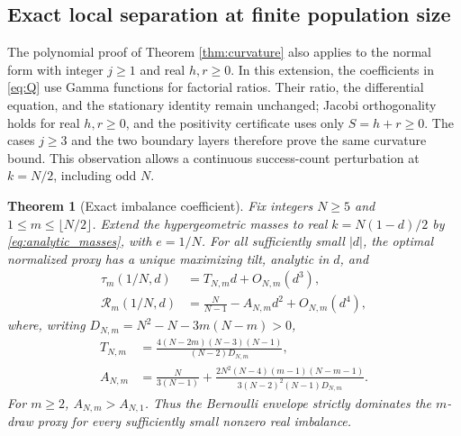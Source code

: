 \documentclass[11pt,a4paper]{article}
\newtheorem{theorem}{Theorem}[section]
\begin{document}
\subsection{Exact local separation at finite population size}
The polynomial proof of Theorem \ref{thm:curvature} also applies to the normal form with integer $j\ge1$ and real $h,r\ge0$. In this extension, the coefficients in \eqref{eq:Q} use Gamma functions for factorial ratios. Their ratio, the differential equation, and the stationary identity remain unchanged; Jacobi orthogonality holds for real $h,r\ge0$, and the positivity certificate uses only $S=h+r\ge0$. The cases $j\ge3$ and the two boundary layers therefore prove the same curvature bound. This observation allows a continuous success-count perturbation at $k=N/2$, including odd $N$.

\begin{theorem}[Exact imbalance coefficient]\label{thm:exact_imbalance}
Fix integers $N\ge5$ and $1\le m\le\lfloor N/2\rfloor$. Extend the hypergeometric masses to real $k=N(1-d)/2$ by \eqref{eq:analytic_masses}, with $e=1/N$. For all sufficiently small $|d|$, the optimal normalized proxy has a unique maximizing tilt, analytic in $d$, and
\begin{align}
 \tau_m(1/N,d)&=T_{N,m}d+O_{N,m}(d^3),\label{eq:finite_tilt}\\
 \mathcal R_m(1/N,d)&=\frac N{N-1}-A_{N,m}d^2+O_{N,m}(d^4),\label{eq:finite_imbalance}
\end{align}
where, writing $D_{N,m}=N^2-N-3m(N-m)>0$,
\begin{align}
 T_{N,m}&=\frac{4(N-2m)(N-3)(N-1)}{(N-2)D_{N,m}},\label{eq:finite_T}\\
 A_{N,m}&=\frac N{3(N-1)}+
 \frac{2N^2(N-4)(m-1)(N-m-1)}
 {3(N-2)^2(N-1)D_{N,m}}.\label{eq:finite_A}
\end{align}
For $m\ge2$, $A_{N,m}>A_{N,1}$. Thus the Bernoulli envelope strictly dominates the $m$-draw proxy for every sufficiently small nonzero real imbalance.
\end{theorem}
\end{document}
